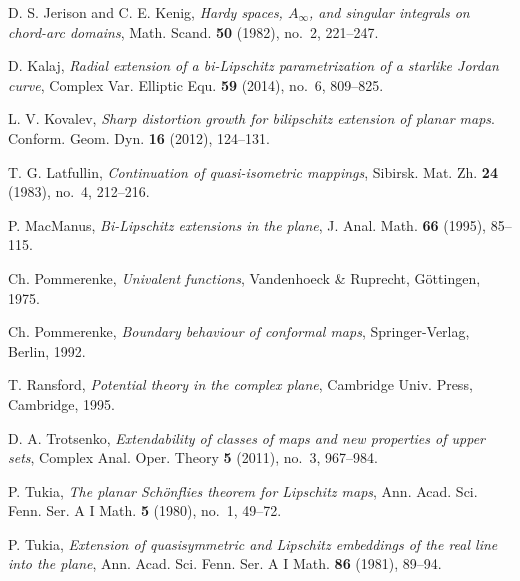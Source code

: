 \documentclass[11pt]{amsart}
\theoremstyle{remark}
\numberwithin{equation}{section}
\begin{document}
\begin{thebibliography}{10}
D. S. Jerison and C. E. Kenig, \textit{Hardy spaces, $A_\infty$, and singular integrals on chord-arc domains},
Math. Scand. \textbf{50} (1982), no.~2, 221--247.

D. Kalaj,
\textit{Radial extension of a bi-Lipschitz parametrization of a starlike Jordan curve},
Complex Var. Elliptic Equ. \textbf{59} (2014), no.~6, 809--825. 

L. V. Kovalev, \textit{Sharp distortion growth for bilipschitz extension of planar maps}. Conform. Geom. Dyn. \textbf{16} (2012), 124--131. 

T. G. Latfullin, 
\textit{Continuation of quasi-isometric mappings},
Sibirsk. Mat. Zh. \textbf{24} (1983), no.~4, 212--216. 


P. MacManus, \textit{Bi-Lipschitz extensions in the plane}, 
J. Anal. Math. \textbf{66} (1995), 85--115. 

Ch. Pommerenke,  \textit{Univalent functions},
Vandenhoeck \& Ruprecht, G\"ottingen, 1975.

Ch. Pommerenke, \textit{Boundary behaviour of conformal maps},
Springer-Verlag, Berlin, 1992.

T. Ransford, \textit{Potential theory in the complex plane},
Cambridge Univ. Press, Cambridge, 1995.


D. A. Trotsenko, 
\textit{Extendability of classes of maps and new properties of upper sets},
Complex Anal. Oper. Theory \textbf{5} (2011), no.~3, 967--984. 

P. Tukia, \textit{The planar Sch\"onflies theorem for Lipschitz maps}, Ann. Acad. Sci. Fenn. Ser. A I Math. {\bf 5} (1980), no.~1, 49--72.

P. Tukia,
\textit{Extension of quasisymmetric and Lipschitz embeddings of the real line into the plane},
Ann. Acad. Sci. Fenn. Ser. A I Math.  \textbf{86}  (1981), 89--94.


\end{thebibliography}
 

  
\end{document}
